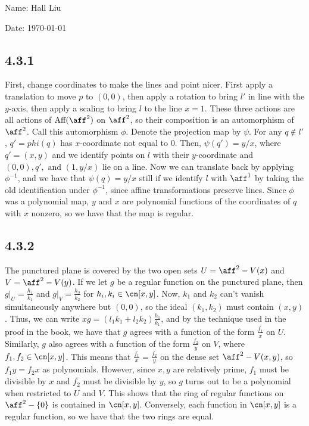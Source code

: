 \documentclass{article}
\begin{document}
Name: Hall Liu

Date: \today 
\vspace{1.5cm}
\subsection*{4.3.1}
First, change coordinates to make the lines and point nicer. First apply a translation to move $p$ to $(0,0)$, then apply a rotation to bring $l'$ in line with the $y$-axis, then apply a scaling to bring $l$ to the line $x=1$. These three actions are all actions of $\text{Aff}(\aff^2)$ on $\aff^2$, so their composition is an automorphism of $\aff^2$. Call this automorphism $\phi$. Denote the projection map by $\psi$. For any $q\not\in l'$, $q'=phi(q)$ has $x$-coordinate not equal to $0$. Then, $\psi(q')=y/x$, where $q'=(x,y)$ and we identify points on $l$ with their $y$-coordinate and $(0,0),q',\text{ and }(1,y/x)$ lie on a line. Now we can translate back by applying $\phi^{-1}$, and we have that $\psi(q)=y/x$ still if we identify $l$ with $\aff^1$ by taking the old identification under $\phi^{-1}$, since affine transformations preserve lines. Since $\phi$ was a polynomial map, $y$ and $x$ are polynomial functions of the coordinates of $q$ with $x$ nonzero, so we have that the map is regular.
\subsection*{4.3.2}
The punctured plane is covered by the two open sets $U=\aff^2-V(x)$ and $V=\aff^2-V(y)$. If we let $g$ be a regular function on the punctured plane, then $g|_U=\frac{h_1}{k_1}$ and $g|_V=\frac{h_2}{k_2}$ for $h_i,k_i\in\cn[x,y]$. Now, $k_1$ and $k_2$ can't vanish simultaneously anywhere but $(0,0)$, so the ideal $(k_1,k_2)$ must contain $(x,y)$. Thus, we can write $xg=(l_1k_1+l_2k_2)\frac{h_1}{k_1}$, and by the technique used in the proof in the book, we have that $g$ agrees with a function of the form $\frac{f_1}{x}$ on $U$. Similarly, $g$ also agrees with a function of the form $\frac{f_2}{y}$ on $V$, where $f_1,f_2\in\cn[x,y]$. This means that $\frac{f_1}{x}=\frac{f_2}{y}$ on the dense set $\aff^2-V(x,y)$, so $f_1y=f_2x$ as polynomials. However, since $x,y$ are relatively prime, $f_1$ must be divisible by $x$ and $f_2$ must be divisible by $y$, so $g$ turns out to be a polynomial when restricted to $U$ and $V$. This shows that the ring of regular functions on $\aff^2-\{0\}$ is contained in $\cn[x,y]$. Conversely, each function in $\cn[x,y]$ is a regular function, so we have that the two rings are equal. 
\end{document}
